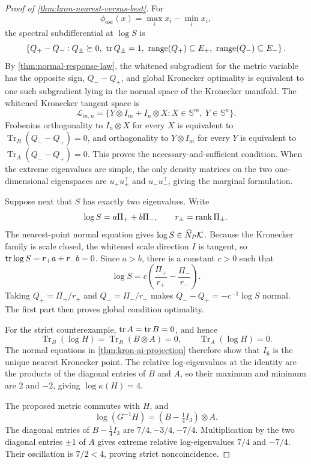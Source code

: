 \begin{proof}[Proof of \cref{thm:kron-nearest-versus-best}]
For
\[
  \phi_{\mathrm{osc}}(x)=\max_i x_i-\min_i x_i,
\]
the spectral subdifferential at \(\log S\) is
\[
  \left\{Q_+-Q_-:
  Q_\pm\succeq0,\ \operatorname{tr} Q_\pm=1,\
  \operatorname{range}(Q_+)\subseteq E_+,\
  \operatorname{range}(Q_-)\subseteq E_-\right\}.
\]
By \cref{thm:normal-response-law}, the whitened subgradient for the metric
variable has the opposite sign, \(Q_--Q_+\), and global Kronecker optimality
is equivalent to one such subgradient lying in the normal space of the
Kronecker manifold. The whitened Kronecker tangent space is
\[
  \mathcal L_{m,n}
  =\{Y\otimes I_m+I_n\otimes X:X\in\mathbb S^m,\ Y\in\mathbb S^n\}.
\]
Frobenius orthogonality to \(I_n\otimes X\) for every \(X\) is equivalent to
\(\operatorname{Tr}_B(Q_--Q_+)=0\), and orthogonality to
\(Y\otimes I_m\) for every \(Y\) is equivalent to
\(\operatorname{Tr}_A(Q_--Q_+)=0\). This proves the necessary-and-sufficient
condition. When the extreme eigenvalues are simple, the only density matrices
on the two one-dimensional eigenspaces are \(u_+u_+^\top\) and
\(u_-u_-^\top\), giving the marginal formulation.

Suppose next that \(S\) has exactly two eigenvalues. Write
\[
  \log S=a\Pi_++b\Pi_-,
  \qquad r_\pm=\operatorname{rank}\Pi_\pm.
\]
The nearest-point normal equation gives \(\log S\in\widehat N_P\mathcal K\).
Because the Kronecker family is scale closed, the whitened scale direction
\(I\) is tangent, so \(\operatorname{tr}\log S=r_+a+r_-b=0\). Since \(a>b\), there is a
constant \(c>0\) such that
\[
  \log S
  =c\left(\frac{\Pi_+}{r_+}-\frac{\Pi_-}{r_-}\right).
\]
Taking \(Q_+=\Pi_+/r_+\) and \(Q_-=\Pi_-/r_-\) makes
\(Q_--Q_+=-c^{-1}\log S\) normal. The first part then proves global
condition optimality.

For the strict counterexample, \(\operatorname{tr} A=\operatorname{tr} B=0\), and hence
\[
  \operatorname{Tr}_B(\log H)
  =\operatorname{Tr}_B(B\otimes A)=0,
  \qquad
  \operatorname{Tr}_A(\log H)=0.
\]
The normal equations in \cref{thm:kron-ai-projection} therefore show that
\(I_6\) is the unique nearest Kronecker point. The relative log-eigenvalues at
the identity are the products of the diagonal entries of \(B\) and \(A\), so
their maximum and minimum are \(2\) and \(-2\), giving
\(\log\kappa(H)=4\).

The proposed metric commutes with \(H\), and
\[
  \log(G^{-1}H)
  =(B-\tfrac14I_3)\otimes A.
\]
The diagonal entries of \(B-\tfrac14I_3\) are
\(7/4,-3/4,-7/4\). Multiplication by the two diagonal entries \(\pm1\) of
\(A\) gives extreme relative log-eigenvalues \(7/4\) and \(-7/4\). Their
oscillation is \(7/2<4\), proving strict noncoincidence.
\end{proof}

